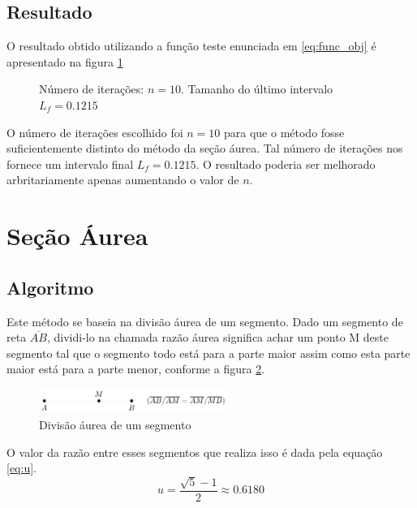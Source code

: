 \documentclass[a4paper,12pt,utf8x,notitlepage]{article}
\begin{document}
\subsection{Resultado}

O resultado obtido utilizando a função teste enunciada em \ref{eq:func_obj} é apresentado na figura \ref{fig:fibo}

\begin{figure}[!h]
\centering
\scalebox{0.85}{}
\caption{Número de iterações: $n=10$. Tamanho do último intervalo $L_f = 0.1215$}
\label{fig:fibo}
\end{figure}

O número de iterações escolhido foi $n=10$ para que o método fosse suficientemente distinto do método da seção áurea. Tal número de iterações nos fornece um intervalo final $L_f = 0.1215$. O resultado poderia ser melhorado arbritariamente apenas aumentando o valor de $n$.

\section{Seção Áurea}

\vspace{0.5cm}

\subsection{Algoritmo}

Este método se baseia na divisão áurea de um segmento. Dado um segmento de reta $\overline{AB}$, dividi-lo na chamada razão áurea significa achar um ponto M deste segmento tal que o segmento todo está para a parte maior assim como esta parte maior está para a parte menor, conforme a figura \ref{fig:div_gold}.

\begin{figure}[!h]
\centering
    \includegraphics[width=0.55\textwidth]{gold.pdf}
    \caption{Divisão áurea de um segmento}
\label{fig:div_gold}
\end{figure}

O valor da razão entre esses segmentos que realiza isso é dada pela equação \ref{eq:u}.
\begin{equation}
u = \frac{\sqrt{5}-1}{2}  \approx 0.6180
\label{eq:u}
\end{equation}
\end{document}
